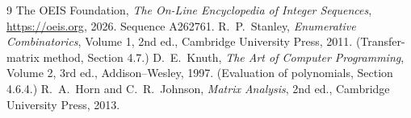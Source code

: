 \documentclass[11pt,a4paper]{article}
\theoremstyle{plain}
\theoremstyle{definition}
\begin{document}
\begin{thebibliography}{9}
 The OEIS Foundation, \emph{The On-Line Encyclopedia of Integer
Sequences}, \url{https://oeis.org}, 2026. Sequence A262761.
 R.~P.~Stanley, \emph{Enumerative Combinatorics}, Volume 1, 2nd ed.,
Cambridge University Press, 2011. (Transfer-matrix method, Section 4.7.)
 D.~E.~Knuth, \emph{The Art of Computer Programming}, Volume 2, 3rd ed.,
Addison--Wesley, 1997. (Evaluation of polynomials, Section 4.6.4.)
 R.~A.~Horn and C.~R.~Johnson, \emph{Matrix Analysis}, 2nd ed., Cambridge
University Press, 2013.
\end{thebibliography}
\end{document}
